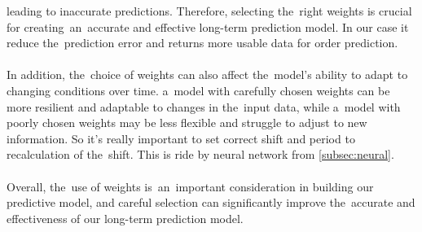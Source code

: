    leading to inaccurate predictions. Therefore, selecting the~right weights is crucial for creating~an~accurate and
    effective long-term prediction model. In our case it reduce the~prediction error and returns more usable
    data for order prediction.\\
    \\
    In addition, the~choice of weights can also affect the~model's ability to adapt to changing conditions over time.
    a~model with carefully chosen weights can be more resilient and adaptable to changes in the~input data,
    while a~model with poorly chosen weights may be less flexible and struggle to adjust to new information.
    So it's really important to set correct shift and period to recalculation of the~shift.
    This is ride by neural network from \ref{subsec:neural}.\\
    \\
    Overall, the~use of weights is~an~important consideration in building our predictive model, and careful selection
    can significantly improve the~accurate and effectiveness of our long-term prediction model.

